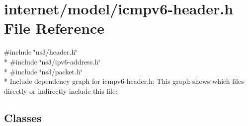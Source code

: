 \hypertarget{icmpv6-header_8h}{}\section{internet/model/icmpv6-\/header.h File Reference}
\label{icmpv6-header_8h}
{\ttfamily \#include \char`\"{}ns3/header.\+h\char`\"{}}\\*
{\ttfamily \#include \char`\"{}ns3/ipv6-\/address.\+h\char`\"{}}\\*
{\ttfamily \#include \char`\"{}ns3/packet.\+h\char`\"{}}\\*
Include dependency graph for icmpv6-\/header.h\+:
This graph shows which files directly or indirectly include this file\+:
\subsection*{Classes}
